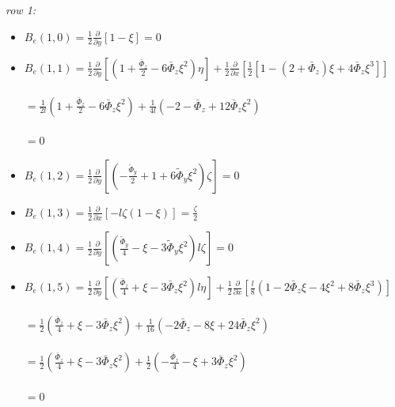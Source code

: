 \documentclass[a4paper,11pt]{article}
\newcommand{\gr}{\textbf}
\begin{document}
\noindent \textit{row 1:}
\begin{itemize}[label=$\gr{-}$, font=\LARGE, font=\color{color1}, topsep = 0.2cm, itemsep=0.2cm]
	\item $B_e(1,0) = \frac{1}{2} \frac{\partial}{\partial y} \left[ 1 - \xi \right] = 0$
	\item $B_e(1,1) = \frac{1}{2} \frac{\partial}{\partial y} \left[ \left( 1 + \frac{\bar{\Phi}_z}{2} - 6 \bar{\Phi}_z \xi^2 \right) \eta \right] + \frac{1}{2} \frac{\partial}{\partial x} \left[ \frac{1}{2} \left[1 - (2 + \bar{\Phi}_z)\xi + 4\bar{\Phi}_z\xi^3 \right] \right]$
	    \\ \\ \text{\hspace{13mm}} $ = \frac{1}{2l} \left( 1 + \frac{\bar{\Phi}_z}{2} - 6 \bar{\Phi}_z \xi^2 \right) + \frac{1}{4l} \left( -2 - \bar{\Phi}_z + 12 \bar{\Phi}_z \xi^2 \right)$
	    \\ \\ \text{\hspace{13mm}} $ = 0 $
	\item $B_e(1,2) = \frac{1}{2} \frac{\partial}{\partial y} \left[ \left( -\frac{\tilde{\Phi}_y}{2} + 1 + 6 \tilde{\Phi}_y \xi^2 \right) \zeta \right] = 0 $
	\item $B_e(1,3) = \frac{1}{2} \frac{\partial}{\partial x} \left[ -l\zeta (1-\xi) \right] = \frac{\zeta}{2} $
	\item $B_e(1,4) = \frac{1}{2} \frac{\partial}{\partial y} \left[ \left( \frac{\tilde{\Phi}_y}{4} - \xi - 3 \tilde{\Phi}_y \xi^2 \right) l \zeta \right] = 0 $
	\item $B_e(1,5) = \frac{1}{2} \frac{\partial}{\partial y} \left[ \left( \frac{\bar{\Phi}_z}{4} + \xi - 3 \bar{\Phi}_z \xi^2 \right) l \eta \right] + \frac{1}{2} \frac{\partial}{\partial x} \left[ \frac{l}{8}\left(1 - 2\bar{\Phi}_z\xi - 4\xi^2 + 8\bar{\Phi}_z\xi^3 \right) \right] $
	    \\ \\ \text{\hspace{13mm}} $ = \frac{1}{2} \left( \frac{\bar{\Phi}_z}{4} + \xi - 3 \bar{\Phi}_z \xi^2 \right) + \frac{1}{16} \left( -2 \bar{\Phi}_z - 8\xi + 24 \bar{\Phi}_z \xi^2 \right)$
	    \\ \\ \text{\hspace{13mm}} $ = \frac{1}{2} \left( \frac{\bar{\Phi}_z}{4} + \xi - 3 \bar{\Phi}_z \xi^2 \right) + \frac{1}{2} \left( -\frac{\bar{\Phi}_z}{4} - \xi + 3 \bar{\Phi}_z \xi^2 \right) $
	    \\ \\ \text{\hspace{13mm}} $ = 0 $

\end{itemize}
\end{document}
